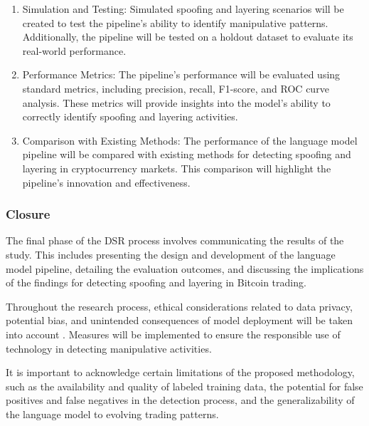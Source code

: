 \begin{enumerate}
    \item Simulation and Testing: Simulated spoofing and layering scenarios will be created to test the pipeline's
    ability to identify manipulative patterns. Additionally, the pipeline will be tested on a holdout dataset to
    evaluate its real-world performance.
    \item Performance Metrics: The pipeline's performance will be evaluated using standard metrics, including precision,
    recall, F1-score, and ROC curve analysis. These metrics will provide insights into the model's ability to correctly
    identify spoofing and layering activities.
    \item Comparison with Existing Methods: The performance of the language model pipeline will be compared with
    existing methods for detecting spoofing and layering in cryptocurrency markets. This comparison will highlight the
    pipeline's innovation and effectiveness.
\end{enumerate}

\subsubsection{Closure}
The final phase of the DSR process involves communicating the results of the study. This includes presenting the design
and development of the language model pipeline, detailing the evaluation outcomes, and discussing the implications of
the findings for detecting spoofing and layering in Bitcoin trading.

Throughout the research process, ethical considerations related to data privacy, potential bias, and unintended
consequences of model deployment will be taken into account \cite{barocas2017fairness, mittelstadt2016ethics}. Measures
will be implemented to ensure the responsible use of technology in detecting manipulative activities.

It is important to acknowledge certain limitations of the proposed methodology, such as the availability and quality of
labeled training data, the potential for false positives and false negatives in the detection process, and the
generalizability of the language model to evolving trading patterns.

%